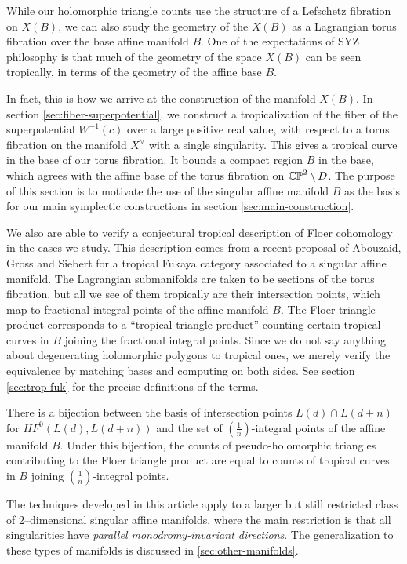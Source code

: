 \documentclass[12pt]{amsart}
\begin{document}
While our holomorphic triangle counts use the structure of a Lefschetz
fibration on $X(B)$, we can also study the geometry of the $X(B)$ as a
Lagrangian torus fibration over the base affine manifold $B$. One of
the expectations of SYZ philosophy is that much of the geometry of the
space $X(B)$ can be seen tropically, in terms of the geometry of the
affine base $B$.

In fact, this is how we arrive at the construction of the manifold
$X(B)$. In section \ref{sec:fiber-superpotential}, we construct a
tropicalization of the fiber of the superpotential $W^{-1}(c)$ over a
large positive real value, with respect to a torus fibration on the
manifold $X^\vee$ with a single singularity. This gives a tropical
curve in the base of our torus fibration. It bounds a compact region
$B$ in the base, which agrees with the affine base of the torus
fibration on $\mathbb{CP}^2\setminus D$. The purpose of this section is to
motivate the use of the singular affine manifold $B$ as the basis for
our main symplectic constructions in section
\ref{sec:main-construction}.

We also are able to verify a conjectural tropical description of Floer
cohomology in the cases we study. This
description comes from a recent proposal of Abouzaid, Gross and
Siebert for a tropical Fukaya category associated to a singular affine
manifold. The Lagrangian submanifolds are taken to be sections of the
torus fibration, but all we see of them tropically are their
intersection points, which map to fractional integral points of the
affine manifold $B$. The Floer triangle product corresponds to a
``tropical triangle product'' counting certain tropical curves in $B$
joining the fractional integral points. Since we do not say anything
about degenerating holomorphic polygons to tropical ones, we merely
verify the equivalence by matching bases and computing on both
sides. See section \ref{sec:trop-fuk} for the precise definitions of
the terms.
\begin{theorem}
  \label{thm:tropical-trangles}
  There is a bijection between the basis of intersection points
  $L(d)\cap L(d+n)$ for $HF^0(L(d),L(d+n))$ and the set of
  $(\frac{1}{n})$-integral points of the affine manifold $B$. Under
  this bijection, the counts of pseudo-holomorphic triangles
  contributing to the Floer triangle product are equal to counts of
  tropical curves in $B$ joining $(\frac{1}{n})$-integral points.
\end{theorem}

The techniques developed in this article apply to a larger but still
restricted class of $2$--dimensional singular affine manifolds, where
the main restriction is that all singularities have \emph{parallel
  monodromy-invariant directions}. The generalization to these types
of manifolds is discussed in \ref{sec:other-manifolds}.
\end{document}
